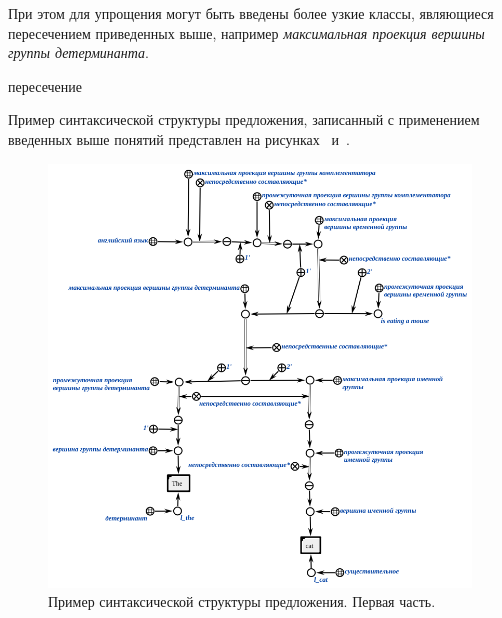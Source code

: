 При этом для упрощения могут быть введены более узкие классы, являющиеся пересечением приведенных выше, например \textit{максимальная проекция вершины группы детерминанта}.

\begin{SCn}

    \begin{scnreltoset}{пересечение}
    \end{scnreltoset}

\end{SCn}

Пример синтаксической структуры предложения, записанный с применением введенных выше понятий представлен на рисунках~\textit{} и~\textit{}.

\begin{figure}[h]
    \centering
    \includegraphics[scale=0.8]{images/part2/chapter_lang/syntactic_structure_part_1}
    \caption{Пример синтаксической структуры предложения. Первая часть.}
    \label{fig:pic_syntactic_tree_part_1}
\end{figure}

